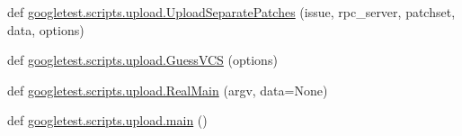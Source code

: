 \begin{DoxyCompactItemize}
\item 
def \mbox{\hyperlink{namespacegoogletest_1_1scripts_1_1upload_a50c5e594327556203e22e04b49cefd3b}{googletest.\+scripts.\+upload.\+Upload\+Separate\+Patches}} (issue, rpc\+\_\+server, patchset, data, options)
\item 
def \mbox{\hyperlink{namespacegoogletest_1_1scripts_1_1upload_ae47e7ae09d5291bc72beb6603a1180bb}{googletest.\+scripts.\+upload.\+Guess\+V\+CS}} (options)
\item 
def \mbox{\hyperlink{namespacegoogletest_1_1scripts_1_1upload_a183984cddc5c98e6dcf10730b3d4f599}{googletest.\+scripts.\+upload.\+Real\+Main}} (argv, data=None)
\item 
def \mbox{\hyperlink{namespacegoogletest_1_1scripts_1_1upload_a6fad2cb34a945e725b3265589a6f7a36}{googletest.\+scripts.\+upload.\+main}} ()
\end{DoxyCompactItemize}
